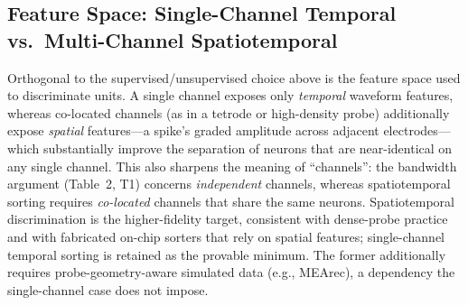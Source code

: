 \subsection*{Feature Space: Single-Channel Temporal vs.\ Multi-Channel Spatiotemporal}
Orthogonal to the supervised/unsupervised choice above is the feature space used to
discriminate units. A single channel exposes only \emph{temporal} waveform features,
whereas co-located channels (as in a tetrode or high-density probe) additionally expose
\emph{spatial} features---a spike's graded amplitude across adjacent electrodes---which
substantially improve the separation of neurons that are near-identical on any single
channel. This also sharpens the meaning of ``channels'': the bandwidth argument
(Table~2, T1) concerns \emph{independent} channels, whereas spatiotemporal sorting
requires \emph{co-located} channels that share the same neurons. Spatiotemporal
discrimination is the higher-fidelity target, consistent with dense-probe practice and
with fabricated on-chip sorters that rely on spatial features; single-channel temporal
sorting is retained as the provable minimum. The former additionally requires
probe-geometry-aware simulated data (e.g., MEArec), a dependency the single-channel case
does not impose.

